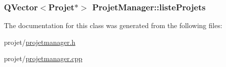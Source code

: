 \subsubsection[{liste\+Projets}]{\setlength{\rightskip}{0pt plus 5cm}Q\+Vector$<${\bf Projet}$\ast$$>$ Projet\+Manager\+::liste\+Projets\hspace{0.3cm}{\ttfamily [private]}}\label{class_projet_manager_a46c2e5dab1e538225fa022030e3a31d1}


The documentation for this class was generated from the following files\+:\begin{DoxyCompactItemize}
\item 
projet/\hyperlink{projetmanager_8h}{projetmanager.\+h}\item 
projet/\hyperlink{projetmanager_8cpp}{projetmanager.\+cpp}\end{DoxyCompactItemize}
